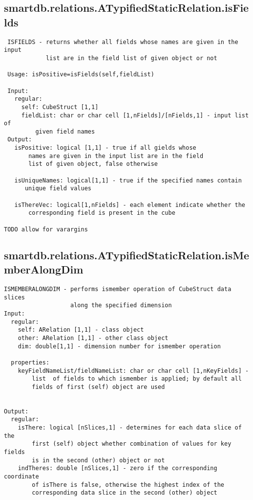 \subsection{\texorpdfstring{smartdb.relations.ATypifiedStaticRelation.isFields}{isFields}}\label{method:smartdb.relations.ATypifiedStaticRelation.isFields}
\begin{verbatim}
 ISFIELDS - returns whether all fields whose names are given in the input
            list are in the field list of given object or not

 Usage: isPositive=isFields(self,fieldList)

 Input:
   regular:
     self: CubeStruct [1,1]
     fieldList: char or char cell [1,nFields]/[nFields,1] - input list of
         given field names
 Output:
   isPositive: logical [1,1] - true if all gields whose
       names are given in the input list are in the field
       list of given object, false otherwise

   isUniqueNames: logical[1,1] - true if the specified names contain
      unique field values

   isThereVec: logical[1,nFields] - each element indicate whether the
       corresponding field is present in the cube

TODO allow for varargins
\end{verbatim}
\subsection{\texorpdfstring{smartdb.relations.ATypifiedStaticRelation.isMemberAlongDim}{isMemberAlongDim}}\label{method:smartdb.relations.ATypifiedStaticRelation.isMemberAlongDim}
\begin{verbatim}
ISMEMBERALONGDIM - performs ismember operation of CubeStruct data slices
                   along the specified dimension
Input:
  regular:
    self: ARelation [1,1] - class object
    other: ARelation [1,1] - other class object
    dim: double[1,1] - dimension number for ismember operation

  properties:
    keyFieldNameList/fieldNameList: char or char cell [1,nKeyFields] -
        list  of fields to which ismember is applied; by default all
        fields of first (self) object are used


Output:
  regular:
    isThere: logical [nSlices,1] - determines for each data slice of the
        first (self) object whether combination of values for key fields
        is in the second (other) object or not
    indTheres: double [nSlices,1] - zero if the corresponding coordinate
        of isThere is false, otherwise the highest index of the
        corresponding data slice in the second (other) object
\end{verbatim}
